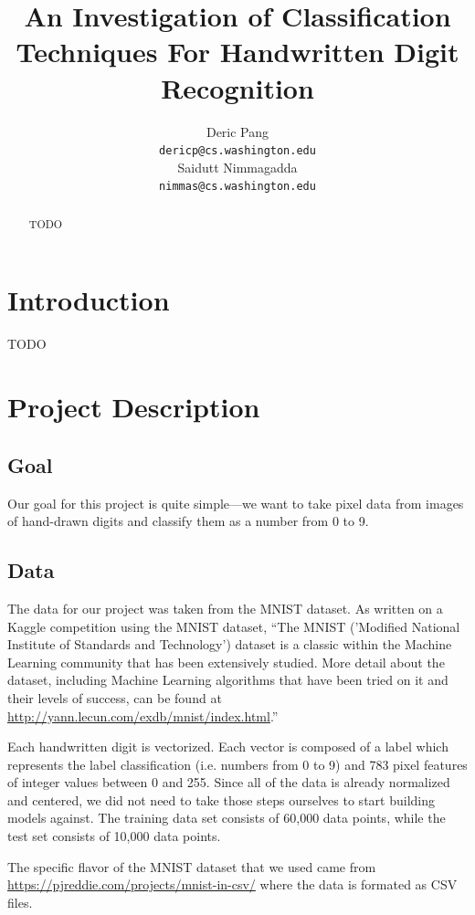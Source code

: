 \documentclass{article} %
\title{An Investigation of Classification Techniques For Handwritten Digit Recognition}
\author{
Deric Pang \\
\texttt{dericp@cs.washington.edu} \\
\And
Saidutt Nimmagadda \\
\texttt{nimmas@cs.washington.edu} \\
}
\begin{document}
\maketitle

\begin{abstract}
  TODO
\end{abstract}

\section{Introduction}
TODO

\section{Project Description}
\subsection{Goal}

Our goal for this project is quite simple---we want to
take pixel data from images of hand-drawn digits
and classify them as a number from 0 to 9.

\subsection{Data}

The data for our project was taken from the MNIST dataset. As written on a
Kaggle competition using the MNIST dataset, ``The MNIST
('Modified National Institute of Standards and Technology') dataset
is a classic within the Machine Learning community that has been extensively
studied. More detail about the dataset, including Machine Learning algorithms
that have been tried on it and their levels of success, can be found at
\href{http://yann.lecun.com/exdb/mnist/index.html}{http://yann.lecun.com/exdb/mnist/index.html}.''

Each handwritten digit is vectorized. Each vector is composed of a label which
represents the label classification (i.e. numbers from 0 to 9) and 783 pixel
features of integer values between 0 and 255. Since all
of the data is already normalized and centered, we did not need to take those
steps ourselves to start building models against. The training data set
consists of 60,000 data points, while the test set consists of 10,000 data
points.

The specific flavor of the MNIST dataset that we used came from
\href{https://pjreddie.com/projects/mnist-in-csv/}{https://pjreddie.com/projects/mnist-in-csv/}
where the data is formated as CSV files.
\end{document}
